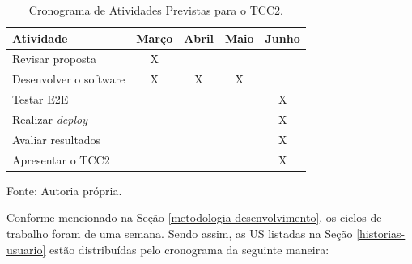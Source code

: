 \newpage

\begin{table}[h!]
\centering
\caption{Cronograma de Atividades Previstas para o TCC2.}
\label{tab:cronograma-atividades-corrigido}
\small
\setlength{\tabcolsep}{4pt}
\begin{tabular}{|l|c|c|c|c|}
\hline
\textbf{Atividade} & \textbf{Março} & \textbf{Abril} & \textbf{Maio} & \textbf{Junho} \\ 
\hline \hline
Revisar proposta & X & & & \\ 
\hline
Desenvolver o software & X & X & X &  \\ 
\hline
Testar E2E & & & & X  \\ 
\hline
Realizar \textit{deploy} & & & & X  \\ 
\hline
Avaliar resultados & & & & X \\ 
\hline
Apresentar o TCC2 & & & & X \\ 
\hline
\end{tabular}
\par\vspace{2mm}
 Fonte: Autoria própria.
\end{table}

Conforme mencionado na Seção \ref{metodologia-desenvolvimento}, os ciclos de trabalho foram de uma semana. Sendo assim, as US listadas na Seção \ref{historias-usuario} estão distribuídas pelo cronograma da seguinte maneira:

